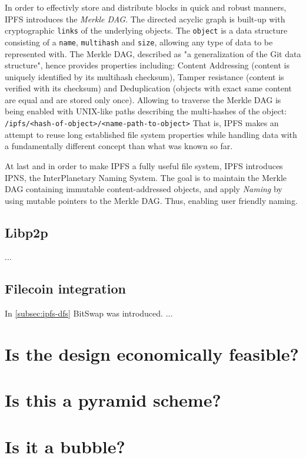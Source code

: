 \documentclass[conference]{IEEEtran}
\begin{document}
In order to effectivly store and distribute blocks in quick and robust manners, IPFS introduces the \textit{Merkle DAG}.
The directed acyclic graph is built-up with cryptographic \texttt{links} of the underlying objects.
The \texttt{object} is a data structure consisting of a \texttt{name}, \texttt{multihash} and \texttt{size}, allowing any type of data to be represented with.
The Merkle DAG, described as "a generalization of the Git data structure"\cite{ipfs-whitepaper}, hence provides properties including: Content Addressing (content is uniquely identified by its multihash checksum), Tamper resistance (content is verified with its checksum) and Deduplication (objects with exact same content are equal and are stored only once). \cite{ipfs-whitepaper}
Allowing to traverse the Merkle DAG is being enabled with UNIX-like paths describing the multi-hashes of the object:\\
\texttt{/ipfs/<hash-of-object>/<name-path-to-object>}
That is, IPFS makes an attempt to reuse long established file system properties while handling data with a fundamentally different concept than what was known so far.

At last and in order to make IPFS a fully useful file system, IPFS introduces IPNS\cite{ipns}, the InterPlanetary Naming System.
The goal is to maintain the Merkle DAG containing immutable content-addressed objects, and apply \textit{Naming} by using mutable pointers to the Merkle DAG.
Thus, enabling user friendly naming. \cite{ipfs-whitepaper}

\subsection{Libp2p}
...

\subsection{Filecoin integration}
In \ref{subsec:ipfs-dfs} BitSwap was introduced.
...


\section{Is the design economically feasible?}
\label{sec:eco-feasibility}

\section{Is this a pyramid scheme?}

\section{Is it a bubble?}
\end{document}
